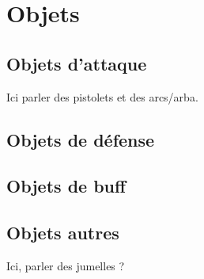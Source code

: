 \section{Objets}
\subsection{Objets d'attaque}
Ici parler des pistolets et des arcs/arba.
\subsection{Objets de défense}
\subsection{Objets de buff}
\subsection{Objets autres}
Ici, parler des jumelles ?